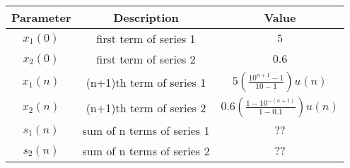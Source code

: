 \begin{tabular}{|c|c|c|}    \hline
     \textbf{Parameter} & \textbf{Description} &     \textbf{Value}\\
     \hline $x_1(0)$ & first term of series 1 &  $5$\\[6pt]
     \hline $x_2(0)$ & first term of series 2 &  $0.6$\\[6pt]
    \hline     $x_1(n)$ & (n+1)th term of series 1 &  $5(\frac{10^{n+1}-1}{10-1})u(n)$\\[6pt]
    \hline      $x_2(n)$ & (n+1)th term of series  2 & $0.6(\frac{1-10^{-(n+1)}}{1-0.1})u(n)$ \\[6pt]
    \hline   $s_1(n)$ &  sum of n terms of series 1& $??$\\[6pt]
    \hline    $s_2(n)$ &  sum of n terms of series 2& $??$\\[6pt]
\end{tabular}
